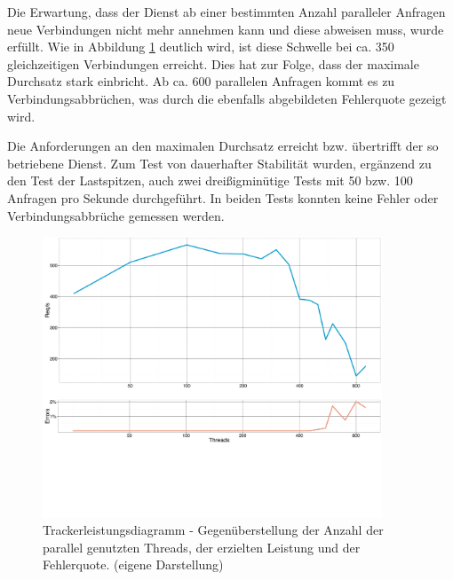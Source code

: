 Die Erwartung, dass der Dienst ab einer bestimmten Anzahl paralleler Anfragen neue Verbindungen nicht mehr annehmen kann und diese abweisen muss, wurde erfüllt. Wie in Abbildung \ref{fig:chart_tracker} deutlich wird, ist diese Schwelle bei ca. 350 gleichzeitigen Verbindungen erreicht. Dies hat zur Folge, dass der maximale Durchsatz stark einbricht. Ab ca. 600 parallelen Anfragen kommt es zu Verbindungsabbrüchen, was durch die ebenfalls abgebildeten Fehlerquote gezeigt wird.

Die Anforderungen an den maximalen Durchsatz erreicht bzw. übertrifft der so betriebene Dienst. Zum Test von dauerhafter Stabilität wurden, ergänzend zu den Test der Lastspitzen, auch zwei dreißigminütige Tests mit  50 bzw. 100 Anfragen pro Sekunde durchgeführt. In beiden Tests konnten keine Fehler oder Verbindungsabbrüche gemessen werden.

\begin{figure}[htb]
  \centering
    \includegraphics[width=0.9\textwidth]{Abbildungen/tracker.pdf}
    \caption[Leistung Tracker]{Trackerleistungsdiagramm - Gegenüberstellung der Anzahl der parallel genutzten Threads, der erzielten Leistung und der Fehlerquote. { \scriptsize (eigene Darstellung)}}
    \label{fig:chart_tracker}
\end{figure}


